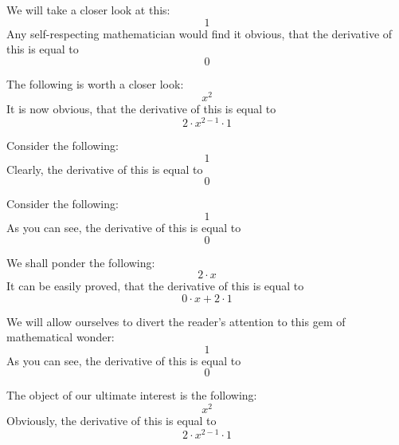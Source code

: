 \documentclass{article}
\begin{document}
We will take a closer look at this:
\begin{equation}
1 
\end{equation}
Any self-respecting mathematician would find it obvious, that the derivative of this is equal to
\begin{equation}
0 
\end{equation}

The following is worth a closer look:
\begin{equation}
x ^{2 } 
\end{equation}
It is now obvious, that the derivative of this is equal to
\begin{equation}
2 \cdot x ^{2 - 1 } \cdot 1 
\end{equation}

Consider the following:
\begin{equation}
1 
\end{equation}
Clearly, the derivative of this is equal to
\begin{equation}
0 
\end{equation}

Consider the following:
\begin{equation}
1 
\end{equation}
As you can see, the derivative of this is equal to
\begin{equation}
0 
\end{equation}

We shall ponder the following:
\begin{equation}
2 \cdot x 
\end{equation}
It can be easily proved, that the derivative of this is equal to
\begin{equation}
0 \cdot x + 2 \cdot 1 
\end{equation}

We will allow ourselves to divert the reader's attention to this gem of mathematical wonder:
\begin{equation}
1 
\end{equation}
As you can see, the derivative of this is equal to
\begin{equation}
0 
\end{equation}

The object of our ultimate interest is the following:
\begin{equation}
x ^{2 } 
\end{equation}
Obviously, the derivative of this is equal to
\begin{equation}
2 \cdot x ^{2 - 1 } \cdot 1 
\end{equation}
\end{document}
